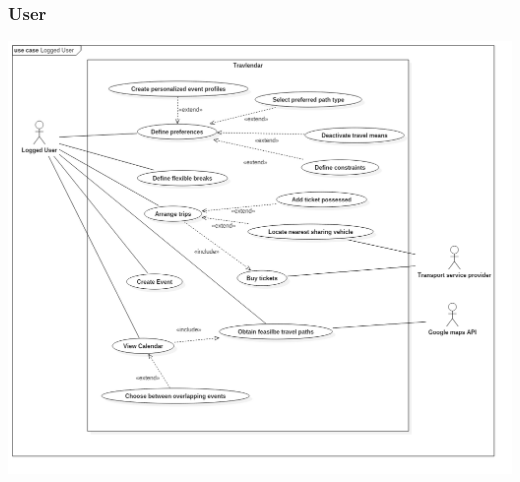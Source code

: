 	\subsubsection{User}
		\includegraphics[width=\textwidth,height=\textheight,keepaspectratio]{images/LoggedUser.png}